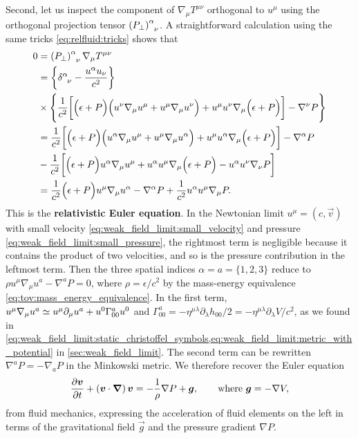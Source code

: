 Second, let us inspect the component of $\nabla_\mu T^{\mu \nu}$ orthogonal to $u^\mu$ using the orthogonal projection tensor $\left(P_\perp\right)\indices{^\alpha_\nu}$.
A straightforward calculation using the same tricks \eqref{eq:relfluid:tricks} shows that
\begin{equation}
\begin{split}
	0 &=      \left(P_\perp\right)\indices{^\alpha_\nu} \nabla_\mu T^{\mu \nu} \\
	  &=      \left\{ \delta\indices{^\alpha_\nu} - \frac{u^\alpha u_\nu}{c^2} \right\} \\
	  &\times \Bigg \{ \frac{1}{c^2} \bigg[ \Big( \epsilon + P \Big) \Big( u^\nu \nabla_\mu u^\mu + u^\mu \nabla_\mu u^\nu \Big) + u^\mu u^\nu \nabla_\mu \Big( \epsilon + P \Big) \bigg] - \nabla^\nu P \Bigg\} \\
	  &=      \frac{1}{c^2} \bigg[ \Big( \epsilon + P \Big) \Big( u^\alpha \nabla_\mu u^\mu + u^\mu \nabla_\mu u^\alpha \Big) + u^\mu u^\alpha \nabla_\mu \Big( \epsilon + P \Big) \bigg] - \nabla^\alpha P \\
	  &-      \frac{1}{c^2} \bigg[ \Big( \epsilon + P \Big) u^\alpha \nabla_\mu u^\mu + u^\alpha u^\mu \nabla_\mu \Big( \epsilon + P \Big) - u^\alpha u^\nu \nabla_\nu P \bigg] \\
	  &=      \frac{1}{c^2} \Big( \epsilon + P \Big) u^\mu \nabla_\mu u^\alpha - \nabla^\alpha P + \frac{1}{c^2} u^\alpha u^\mu \nabla_\mu P .
\end{split}
\label{eq:relfluid:euler_equation}
\end{equation}
This is the \textbf{relativistic Euler equation}. 
In the Newtonian limit $u^\mu = (c, \vec{v})$ with small velocity \eqref{eq:weak_field_limit:small_velocity} and pressure \eqref{eq:weak_field_limit:small_pressure}, the rightmost term is negligible because it contains the product of two velocities, and so is the pressure contribution in the leftmost term.
Then the three spatial indices $\alpha = a = \{1, 2, 3\}$ reduce to $\rho u^\mu \nabla_\mu u^a - \nabla^a P = 0$, where $\rho = \epsilon / c^2$ by the mass-energy equivalence \eqref{eq:tov:mass_energy_equivalence}.
In the first term, $u^\mu \nabla_\mu u^a \simeq u^\mu \partial_\mu u^a + u^0 \Gamma^a_{00} u^0$ and $\Gamma^a_{00} = -\eta^{\mu \lambda} \partial_\lambda h_{00} / 2 = -\eta^{\mu \lambda} \partial_\lambda V / c^2$, as we found in \cref{eq:weak_field_limit:static_christoffel_symbols,eq:weak_field_limit:metric_with_potential} in \cref{sec:weak_field_limit}.
The second term can be rewritten $\nabla^a P = -\nabla_a P$ in the Minkowski metric.
We therefore recover the Euler equation
\cite[equation 4.3]{ref:iver}
\begin{equation}
	\pdv{{\bm{v}}}{t} + \left( {\bm{v}} \cdot {\bm{\nabla}} \right) {\bm{v}} = -\frac{1}{\rho} \nabla P + {\bm{g}} ,
	\qquad \text{where } {\bm{g}} = -\nabla V ,
\end{equation}
from fluid mechanics, expressing the acceleration of fluid elements on the left in terms of the gravitational field $\vec{g}$ and the pressure gradient $\nabla P$.


